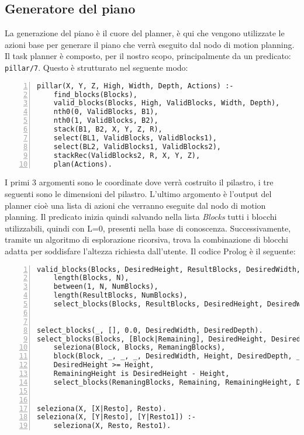 \subsection{Generatore del piano}
\label{subsec:generatorepiano}
La generazione del piano è il cuore del planner, è qui che vengono utilizzate le azioni base per generare il piano che verrà eseguito dal nodo di motion planning. Il task planner è composto, per il nostro scopo, principalmente da un predicato: \verb+pillar/7+.
Questo è strutturato nel seguente modo:
\begin{lstlisting}[numbers=left]
pillar(X, Y, Z, High, Width, Depth, Actions) :-
    find_blocks(Blocks),
    valid_blocks(Blocks, High, ValidBlocks, Width, Depth),
    nth0(0, ValidBlocks, B1),
    nth0(1, ValidBlocks, B2),
    stack(B1, B2, X, Y, Z, R),
    select(BL1, ValidBlocks, ValidBlocks1),
    select(BL2, ValidBlocks1, ValidBlocks2),
    stackRec(ValidBlocks2, R, X, Y, Z),
    plan(Actions).
\end{lstlisting}
I primi 3 argomenti sono le coordinate dove verrà costruito il pilastro, i tre seguenti sono le dimensioni del pilastro. L'ultimo argomento è l'output del planner cioè una lista di azioni che verranno eseguite dal nodo di motion planning.
Il predicato inizia quindi salvando nella lista \textit{Blocks} tutti i blocchi utilizzabili, quindi con L=0, presenti nella base di conoscenza.
Successivamente, tramite un algoritmo di esplorazione ricorsiva, trova la combinazione di blocchi adatta per soddisfare l'altezza richiesta dall'utente. Il codice Prolog è il seguente:
\begin{lstlisting}[numbers=left]
valid_blocks(Blocks, DesiredHeight, ResultBlocks, DesiredWidth, DesiredDepth) :-
    length(Blocks, N),               
    between(1, N, NumBlocks),        
    length(ResultBlocks, NumBlocks),  
    select_blocks(Blocks, ResultBlocks, DesiredHeight, DesiredWidth, DesiredDepth). 


select_blocks(_, [], 0.0, DesiredWidth, DesiredDepth). 
select_blocks(Blocks, [Block|Remaining], DesiredHeight, DesiredWidth, DesiredDepth) :-
    seleziona(Block, Blocks, RemaningBlocks), 
    block(Block, _, _, _, DesiredWidth, Height, DesiredDepth, _, _, _, _, _, _), 
    DesiredHeight >= Height,                
    RemainingHeight is DesiredHeight - Height,
    select_blocks(RemaningBlocks, Remaining, RemainingHeight, DesiredWidth, DesiredDepth). 


seleziona(X, [X|Resto], Resto).
seleziona(X, [Y|Resto], [Y|Resto1]) :-
    seleziona(X, Resto, Resto1).
\end{lstlisting}
